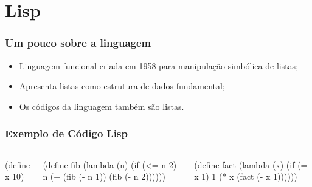 
\section{Lisp}

\begin{frame}
  \frametitle{Um pouco sobre a linguagem}
  \begin{itemize}
    \item Linguagem funcional criada em 1958 para manipulação simbólica de listas; \vspace{1cm}
    \pause
    \item Apresenta listas como estrutura de dados fundamental; \vspace{1cm}
    \pause
    \item Os códigos da linguagem também são listas. \vspace{1cm}
  \end{itemize}
\end{frame}

\begin{frame}[fragile]
  \frametitle{Exemplo de Código Lisp}
  \begin{columns}
    \begin{code}
    (define x 10)
    \end{code}
    \pause
    \begin{code}
    (define fib
      (lambda (n)
        (if (<= n 2)
            n
            (+ (fib (- n 1))
               (fib (- n 2))))))
    \end{code}
    \pause
    \begin{code}
(define fact
  (lambda (x)
    (if (= x 1)
        1
        (* x
           (fact (- x 1))))))
    \end{code}
  \end{columns}
\end{frame}
